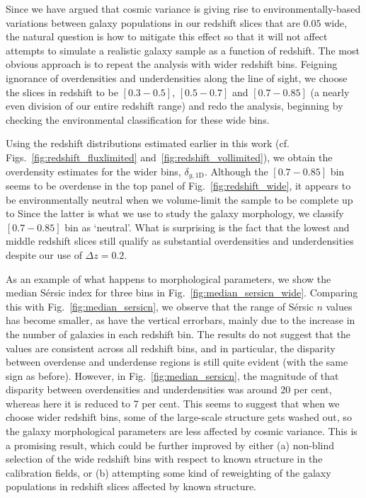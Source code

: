 \documentclass[twocolumn,useAMS,usenatbib]{mn2e}
\newcommand{\rachel}[1]{{\textcolor{red}{#1}}}
\newcommand{\sersic}{S\'{e}rsic }
\newcommand{\s}{\ensuremath{\mathcal{S}}}
\begin{document}
Since we have argued that cosmic variance is giving rise to
environmentally-based variations between galaxy populations in our
redshift slices that are $0.05$ wide, the natural question is how to
mitigate this effect so that it will not affect attempts to simulate a
realistic galaxy sample as a function of redshift.  The most obvious
approach is to repeat the analysis with wider redshift bins. Feigning ignorance of overdensities and underdensities along the line of sight, we choose the slices in redshift to be $\left[ 0.3 - 0.5 \right]$,
$\left[ 0.5 - 0.7\right]$ and $\left[ 0.7 - 0.85\right]$ (a nearly
even division of our entire redshift range) and redo the analysis,
beginning by checking the environmental classification for these wide bins.

Using the redshift distributions estimated earlier in this work (cf. Figs.~\ref{fig:redshift_fluxlimited}
and~\ref{fig:redshift_vollimited}), we obtain the overdensity estimates for
the wider bins, $\delta_{g,\text{1D}}$.
Although the $\left[ 0.7 - 0.85\right]$ bin seems to be overdense in
the top panel of Fig.~\ref{fig:redshift_wide}, it appears to be
environmentally neutral when we volume-limit the sample to be complete up to
Since the latter is what we use to study the galaxy morphology, we
classify $\left[ 0.7 - 0.85\right]$ bin as `neutral'.
What is surprising is the fact that the lowest and middle redshift
slices still qualify as substantial overdensities and underdensities
despite our use of $\Delta z=0.2$.

As an example of what happens to morphological parameters, we show the
median \sersic index for three bins in
Fig.~\ref{fig:median_sersicn_wide}.  Comparing this with
Fig.~\ref{fig:median_sersicn}, we observe that the 
range of \sersic $n$ values has become smaller, as have the vertical errorbars, mainly due to the increase in the number of galaxies in each redshift bin. The results do not suggest that the values
are consistent across all redshift bins, and in particular, the
disparity between overdense and underdense regions is still quite
evident (with the same sign as before). However, in
Fig.~\ref{fig:median_sersicn}, the magnitude of that disparity between
overdensities and underdensities was around 20 per cent, whereas here
it is reduced to 7 per cent.  This seems to suggest that when we
choose wider redshift bins, some of the large-scale structure gets washed out, 
so the galaxy morphological parameters are less affected by cosmic
variance.  This is a promising result, which could be further improved
by either (a) non-blind selection of the wide redshift bins with respect to
known structure in the calibration fields, or (b) attempting some kind of
reweighting of the galaxy populations in redshift slices affected by
known structure.
\end{document}
